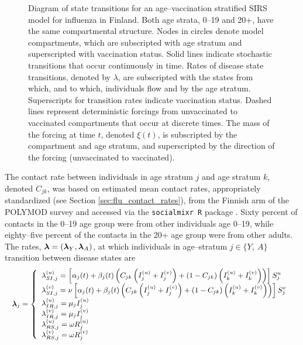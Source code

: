 \begin{figure}[htbp]
	\caption[Diagram of state transitions for an age--vaccination stratified SIRS model for influenza.]{Diagram of state transitions for an age--vaccination stratified SIRS model for influenza in Finland. Both age strata, 0--19 and 20+, have the same compartmental structure. Nodes in circles denote model compartments, which are subscripted with age stratum and superscripted with vaccination status. Solid lines indicate stochastic transitions that occur continuously in time. Rates of disease state transitions, denoted by $ \lambda $, are subscripted with the states from which, and to which, individuals flow and by the age stratum. Superscripts for transition rates indicate vaccination status. Dashed lines represent deterministic forcings from unvaccinated to vaccinated compartments that occur at discrete times. The mass of the forcing at time $ t $, denoted $ \xi(t) $, is subscripted by the compartment and age stratum, and superscripted by the direction of the forcing (unvaccinated to vaccinated).} 
	\label{fig:flu_sirs_diag}
\end{figure}

The contact rate between individuals in age stratum $ j $ and age stratum $ k $, denoted $ C_{jk} $, was based on estimated mean contact rates, appropriately standardized (see Section \ref{sec:flu_contact_rates}), from the Finnish arm of the POLYMOD survey \cite{mossong2008social,polymod} and accessed via the \texttt{socialmixr R} package \cite{funk2018socialmixr}. Sixty percent of contacts in the 0--19 age group were from other individuals age 0--19, while eighty--five percent of the contacts in the 20+ age group were from other adults.  The rates, $ \boldsymbol{\lambda} = (\boldsymbol{\lambda}_{Y},\boldsymbol{\lambda}_{A}) $, at which individuals in age--stratum $ j \in \lbrace Y,\ A\rbrace $ transition between disease states are
\begin{equation}\small
\label{eqn:flu_sirs_rates}
\boldsymbol{\lambda}_{j} = \left\lbrace
\begin{array}{ll}
\lambda_{SI,j}^{(u)} = \left [\alpha_{j}(t) + \beta_{j}(t)\left (C_{jk}\left (I_{j}^{(u)} + I_{j}^{(v)}\right ) + (1-C_{jk})\left (I_{k}^{(u)} + I_{k}^{(v)}\right )\right )\right ]S_{j}^{u} \\ 
\lambda_{SI,j}^{(v)} = \nu\left [\alpha_{j}(t) + \beta_{j}(t)\left (C_{jk}\left (I_{j}^{(u)} + I_{j}^{(v)}\right ) + (1-C_{jk})\left (I_{k}^{(u)} + I_{k}^{(v)}\right )\right )\right ]S_{j}^{v}\\
\lambda_{IR,j}^{(u)} = \mu_{j} I_{j}^{(u)} \\
\lambda_{IR,j}^{(v)} = \mu_{j} I_{j}^{(v)} \\
\lambda_{RS,j}^{(u)} = \omega R_{j}^{(u)} \\
\lambda_{RS,j}^{(v)} = \omega R_{j}^{(v)}
\end{array}
\right .
\end{equation}


